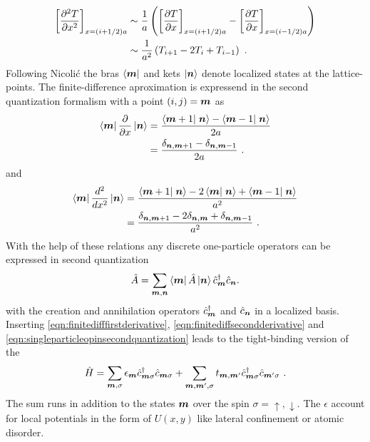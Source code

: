 \begin{align}
  \left[\frac{\partial^2 T}{\partial x^2}\right]_{x=(i+1/2)a} &\sim \frac{1}{a}\left( \left[\frac{\partial T}{\partial x}\right]_{x=(i+1/2)a}-\left[\frac{\partial T}{\partial x}\right]_{x=(i-1/2)a} \right) \notag \\
  &\sim \frac{1}{a^2}\left(T_{i+1}-2T_{i}+T_{i-1}\right)\ .
  \label{ApproximateSecondDerivative}
\end{align}
Following Nicoli\'c \cite{Nikolic2010} the bras $\left< \boldsymbol{m} \right|$ and kets $\left| \boldsymbol{n} \right>$ denote localized states at the lattice-points. The finite-difference aproximation is  expressend in the second quantization formalism with a point $(i,j) = \boldsymbol{m}$ as
\begin{align}
	\bra{\v{m}} \pd{}{x} \ket{\v{n}} &= \frac{\braket{\v{m}+1}{\v{n}}-\braket{\v{m}-1}{\v{n}}}{2a}\notag\\ 
				&= \frac{\delta_{\v{n},\v{m}+1}-\delta_{\v{n},\v{m}-1}}{2a}\ .
	\label{eqn:finitedifffirstderivative}
\end{align}
and
\begin{align}
	\bra{\v{m}} \dd{}{x} \ket{\v{n}} &= \frac{\braket{\v{m}+1}{\v{n}}-2\braket{\v{m}}{\v{n}}+\braket{\v{m}-1}{\v{n}}}{a^2} \\
				 &= \frac{\delta_{\v{n},\v{m}+1}-2\delta_{\v{n},\v{m}}+\delta_{\v{n},\v{m}-1}}{a^2}\ .
	\label{eqn:finitediffsecondderivative}
\end{align}
With the help of these relations any discrete one-particle operators can be expressed in second quantization
\begin{align}
	\hat{A} = \sum_{\boldsymbol{m},\boldsymbol{n}} \left< \boldsymbol{m} \right|\hat{A}\left| \boldsymbol{n} \right> \hat{c}^{\dagger}_{\boldsymbol{m}} \hat{c}_{\boldsymbol{n}}.
 \label{eqn:singleparticleopinsecondquantization}
\end{align}
with the creation and annihilation operators $\hat{c}^{\dagger}_{\boldsymbol{m}}$ and $\hat{c}_{\boldsymbol{n}}$ in a localized basis.
Inserting \cref{eqn:finitedifffirstderivative}, \ref{eqn:finitediffsecondderivative} and \ref{eqn:singleparticleopinsecondquantization} leads to the tight-binding version of the \hamil{}
\begin{align}
	\hat{H} = \sum_{\boldsymbol{m},\sigma} \epsilon_{\boldsymbol{m}} \hat{c}^{\dagger}_{\boldsymbol{m}\sigma} \hat{c}_{\boldsymbol{m}\sigma} +
	\sum_{\boldsymbol{m},\boldsymbol{m}',\sigma} t_{\boldsymbol{m},\boldsymbol{m}'} \hat{c}^{\dagger}_{\boldsymbol{m}\sigma} \hat{c}_{\boldsymbol{m}'\sigma}\ .
	\label{eqn:discretizedeffectivemassHamil}
\end{align}
The sum runs in addition to the states $\boldsymbol{m}$ over the spin $\sigma=\uparrow,\downarrow$. The $\epsilon$ account for local potentials in the form of $U(x,y)$ like lateral confinement or atomic disorder.
